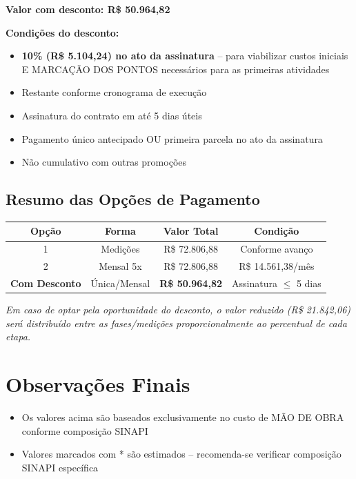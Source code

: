 \documentclass[12pt,a4paper]{article}
\renewenvironment{table}%
{\begin{center}%
\scriptsize%
\addtolength{\tabcolsep}{-2pt}%
}%
{\end{center}}
\begin{document}
\noindent\textbf{Valor com desconto: R\$ 50.964,82}

\noindent\textbf{Condições do desconto:}
\begin{itemize}
\item \textbf{10\% (R\$ 5.104,24) no ato da assinatura} -- para viabilizar custos iniciais E MARCAÇÃO DOS PONTOS necessários para as primeiras atividades
\item Restante conforme cronograma de execução
\item Assinatura do contrato em até 5 dias úteis
\item Pagamento único antecipado OU primeira parcela no ato da assinatura
\item Não cumulativo com outras promoções
\end{itemize}

\subsection{Resumo das Opções de Pagamento}

\begin{table}
\centering
\begin{tabular}{cccc}
\toprule
\textbf{Opção} & \textbf{Forma} & \textbf{Valor Total} & \textbf{Condição} \\
\midrule
1 & Medições & R\$ 72.806,88 & Conforme avanço \\
2 & Mensal 5x & R\$ 72.806,88 & R\$ 14.561,38/mês \\
\textbf{Com Desconto} & Única/Mensal & \textbf{R\$ 50.964,82} & Assinatura $\leq$ 5 dias \\
\bottomrule
\end{tabular}
\end{table}

\noindent\textit{Em caso de optar pela oportunidade do desconto, o valor reduzido (R\$ 21.842,06) será distribuído entre as fases/medições proporcionalmente ao percentual de cada etapa.}

\pagebreak

\section{Observações Finais}

\begin{itemize}
\item Os valores acima são baseados exclusivamente no custo de MÃO DE OBRA conforme composição SINAPI
\item Valores marcados com * são estimados -- recomenda-se verificar composição SINAPI específica
\end{itemize}
\end{document}
